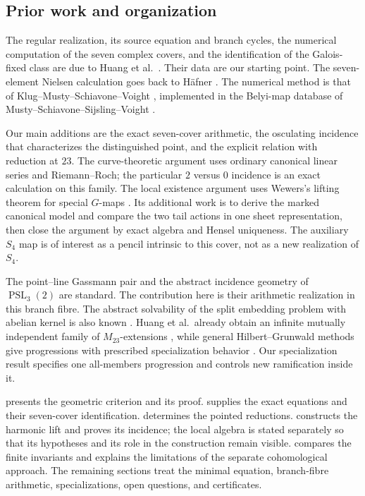 \documentclass[11pt]{amsart}
\theoremstyle{definition}
\theoremstyle{remark}
\newcommand{\PSL}{\operatorname{PSL}}
\begin{document}
\subsection{Prior work and organization}
\label{sec:prior-work}

The regular realization, its source equation and branch cycles, the
numerical computation of the seven complex covers, and the identification
of the Galois-fixed class are due to Huang et al.\ \cite{HJLPPZ}.
Their data \cite{M23data} are our starting point.
The seven-element Nielsen calculation goes back to H\"afner
\cite{BraidOrbits}.  The numerical method is that of
Klug--Musty--Schiavone--Voight \cite{KMSV}, implemented in the
Belyi-map database of Musty--Schiavone--Sijsling--Voight \cite{BelyiDB}.

Our main additions are the exact seven-cover arithmetic, the osculating
incidence that characterizes the distinguished point, and the explicit
relation with reduction at $23$.  The curve-theoretic argument uses ordinary
canonical linear series and Riemann--Roch; the particular $2$ versus $0$
incidence is an exact calculation on this family.  The local existence
argument uses Wewers's lifting theorem for special $G$-maps
\cite{Wewers}.  Its additional work is to derive the marked canonical
model and compare the two tail actions in one sheet representation,
then close the argument by exact algebra and Hensel uniqueness.
The auxiliary $S_4$ map is of interest as a pencil intrinsic to this
cover, not as a new realization of $S_4$.

The point--line Gassmann pair and the abstract incidence geometry of
$\PSL_3(2)$ are standard.  The contribution here is their arithmetic
realization in this branch fibre.  The abstract solvability of the
split embedding problem with abelian kernel is also known
\cite{LegrandEmbedding}.  Huang et al.\ already obtain an infinite
mutually independent family of $M_{23}$-extensions
\cite[Corollary~1.4(d)]{HJLPPZ}, while general Hilbert--Grunwald
methods give progressions with prescribed specialization behavior
\cite{DebesGhazi,Legrand}.  Our specialization result specifies one
all-members progression and controls new ramification inside it.

 presents the geometric criterion and its proof.
 supplies the exact equations and their
seven-cover identification.
 determines the pointed reductions.
 constructs the harmonic lift and
proves its incidence; the local algebra is stated separately so that
its hypotheses and its role in the construction remain visible.
 compares the finite invariants and explains
the limitations of the separate cohomological approach.
The remaining sections treat the minimal equation, branch-fibre
arithmetic, specializations, open questions, and certificates.
\end{document}
